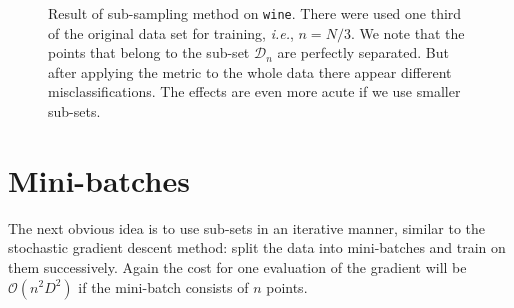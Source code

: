 \begin{figure}
  \centering
  \caption{Result of sub-sampling method on \texttt{wine}. There were used one third of the original data set for training, \textit{i.e.}, $n = N/3$. We note that the points that belong to the sub-set $\mathcal{D}_n$ are perfectly separated. But after applying the metric to the whole data there appear different misclassifications. The effects are even more acute if we use smaller sub-sets.}
  \label{fig:sub-sampling}
\end{figure}

\section{Mini-batches}
\label{sec:mini-batches}

The next obvious idea is to use sub-sets in an iterative manner, similar to the stochastic gradient descent method: split the data into mini-batches and train on them successively. Again the cost for one evaluation of the gradient will be $\mathcal{O}(n^2D^2)$ if the mini-batch consists of $n$ points.

